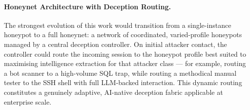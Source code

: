 \paragraph{Honeynet Architecture with Deception Routing.}
The strongest evolution of this work would transition from a single-instance honeypot to a full honeynet: a network of coordinated, varied-profile honeypots managed by a central deception controller. On initial attacker contact, the controller could route the incoming session to the honeypot profile best suited to maximising intelligence extraction for that attacker class — for example, routing a bot scanner to a high-volume SQL trap, while routing a methodical manual tester to the SSH shell with full LLM-backed interaction. This dynamic routing constitutes a genuinely adaptive, AI-native deception fabric applicable at enterprise scale.
